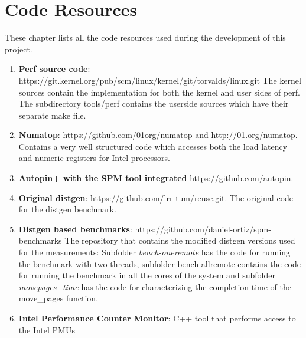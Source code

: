 \chapter{Code Resources}\label{app:coderes}

These chapter lists all the code resources used during the development of this project.

\begin{enumerate}
	\item \textbf{Perf source code}: https://git.kernel.org/pub/scm/linux/kernel/git/torvalds/linux.git The kernel sources contain the implementation for both the kernel and user sides of perf. The subdirectory tools/perf contains the userside sources which have their separate make file.
	\item \textbf{Numatop}: https://github.com/01org/numatop and http://01.org/numatop. Contains a very well structured code which accesses both the load latency and numeric registers for Intel processors.
	\item \textbf{Autopin+ with the SPM tool integrated} https://github.com/autopin.
	\item \textbf{Original distgen}: https://github.com/lrr-tum/reuse.git. The original code for the distgen benchmark.
	\item \textbf{Distgen based benchmarks}: https://github.com/daniel-ortiz/spm-benchmarks The repository that contains the modified distgen versions used for the measurements: Subfolder \textit{bench-oneremote} has the code for running the benchmark with two threads, subfolder {bench-allremote} contains the code for running the benchmark in all the cores of the system and subfolder \textit{movepages\_time} has the code for characterizing the completion time of the move\_pages function.
	\item \textbf{Intel Performance Counter Monitor}: C++ tool that performs access to the Intel PMUs
\end{enumerate}

